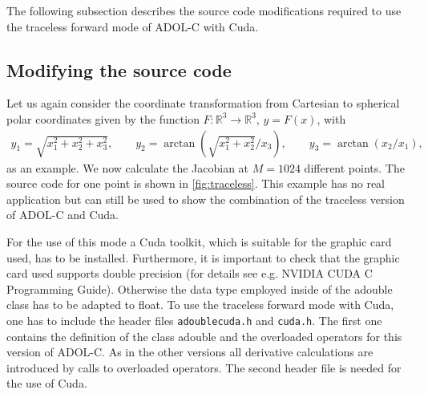 \documentclass[11pt,twoside]{article}
\begin{document}
The following subsection describes the source code modifications required to use 
the traceless forward mode of ADOL-C with Cuda.  

\subsection{Modifying the source code}

Let us again consider the coordinate transformation from Cartesian to spherical
polar coordinates given by the function $F: \mathbb{R}^3 \to \mathbb{R}^3$, $y
= F(x)$, with
\begin{eqnarray*}
y_1  =  \sqrt{x_1^2 + x_2^2 + x_3^2},\qquad
y_2  =  \arctan\left(\sqrt{x_1^2 + x_2^2}/x_3\right),\qquad
y_3  =  \arctan(x_2/x_1),
\end{eqnarray*}
as an example. We now calculate the Jacobian at $M=1024$ different points.
The source code for one point is shown in \autoref{fig:traceless}. This example 
has no real application but can still be used to show the combination of the traceless version
of ADOL-C and Cuda.

For the use of this mode a Cuda toolkit, which is suitable for the graphic card used,
has to be installed. Furthermore, it is important to check that the graphic card
used supports double precision (for details see e.g. NVIDIA CUDA C Programming Guide).
Otherwise the data type employed inside of the {\sf adouble} class has to be adapted
to {\sf float}. To use the traceless forward mode with Cuda, one has to include the header
files \verb#adoublecuda.h# and \verb#cuda.h#. The first one contains the 
definition of the class {\sf adouble} and the overloaded operators
for this version of ADOL-C. As in the other versions all derivative 
calculations are introduced by calls to overloaded operators. The 
second header file is needed for the use of Cuda.  
\end{document}

